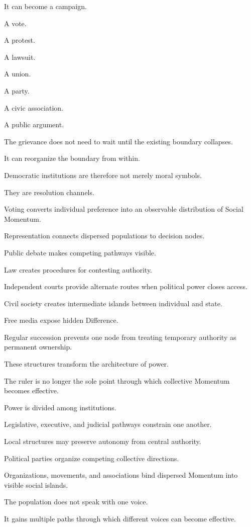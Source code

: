 It can become a campaign.

A vote.

A protest.

A lawsuit.

A union.

A party.

A civic association.

A public argument.

The grievance does not need to wait until the existing boundary collapses.

It can reorganize the boundary from within.

Democratic institutions are therefore not merely moral symbols.

They are resolution channels.

Voting converts individual preference into an observable distribution of Social Momentum.

Representation connects dispersed populations to decision nodes.

Public debate makes competing pathways visible.

Law creates procedures for contesting authority.

Independent courts provide alternate routes when political power closes access.

Civil society creates intermediate islands between individual and state.

Free media expose hidden Difference.

Regular succession prevents one node from treating temporary authority as permanent ownership.

These structures transform the architecture of power.

The ruler is no longer the sole point through which collective Momentum becomes effective.

Power is divided among institutions.

Legislative, executive, and judicial pathways constrain one another.

Local structures may preserve autonomy from central authority.

Political parties organize competing collective directions.

Organizations, movements, and associations bind dispersed Momentum into visible social islands.

The population does not speak with one voice.

It gains multiple paths through which different voices can become effective.

